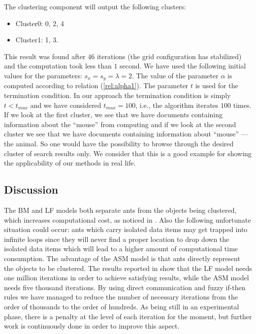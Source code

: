 The clustering component will output the following clusters:
\begin{itemize}
	\item 	Cluster0: 0, 2, 4 
	\item Cluster1: 1, 3.
\end{itemize}

This result was found after $46$ iterations (the grid configuration has stabilized) and the computation took less than $1$ second. We have used the following initial values for the 
parameters:  \begin{math} s_x = s_y =  \lambda = 2 \end{math}. The value of the parameter \begin{math} \alpha \end{math} is computed according to relation (\ref{rel:alpha1}).  The parameter $t$ is used for the  termination condition. In our approach the termination condition is simply  \begin{math} t < t_{max}  \end{math} and we have considered  \begin{math} t_{max} = 100 \end{math}, i.e., the algorithm iterates $100$ times.
If we look at the first cluster, we see that we have documents containing information about the ``mouse'' from computing and if we look at the second cluster we see that we have documents containing information about ``mouse'' --- the animal. So one would have the possibility to browse through the desired cluster of search results only. We consider that this is a good example for showing the applicability of our methods in real life.

\subsection{Discussion}
\label{sec:clustdiscussion}

The BM \cite{Deneubourg91TheDynamic} and LF \cite{Lumer94Diversity} models both separate ants from the objects being clustered, which increases computational cost, as noticed in \cite{Chen04AnAdaptive}. Also the following unfortunate situation could occur: ants which carry isolated data items may get trapped into infinite loops since they will never find a proper location to drop down the isolated data items which will lead to a higher amount of computational time consumption. The advantage of the ASM model is that ants directly represent the objects to be clustered. The results reported in \cite{Chen04AnAdaptive} show that the LF model needs one million iterations in order to achieve satisfying results, while the ASM model  needs five thousand iterations. By using direct communication and fuzzy if-then rules we have managed to reduce the number of necessary iterations from the order of thousands to the order of hundreds. As being still in an experimental phase, there is a penalty at the level of each iteration for the moment, but further work is continuously done in order to improve this aspect. 

